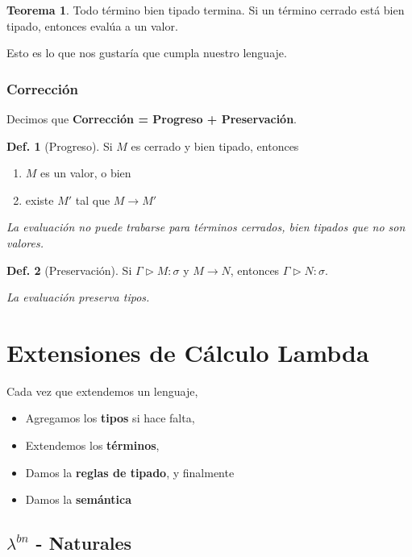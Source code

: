 \documentclass{report}
\theoremstyle{definition} %
\newtheorem{theorem}{Teorema}[chapter]
\newtheorem{definition}{Def.}[chapter]
\newcommand{\tipa}[3]{#1 \rhd #2 : #3} %
\newcommand{\Gtipa}[2]{\tipa{\Gamma}{#1}{#2}}
\newcommand{\lambdabn}{\lambda^{bn}}
\newcommand{\reduces}{\to}
\newcommand{\reduce}[2]{#1 \reduces #2}
\begin{document}
\begin{theorem}
    Todo término bien tipado termina. Si un término cerrado está bien tipado,
    entonces evalúa a un valor.
\end{theorem}

Esto es lo que nos gustaría que cumpla nuestro lenguaje.

\subsubsection{Corrección}\label{sec:correccion}

Decimos que \textbf{Corrección = Progreso + Preservación}.

\begin{definition}[Progreso]
    Si $M$ es cerrado y bien tipado, entonces
    \begin{enumerate}
        \item $M$ es un valor, o bien
        \item existe $M'$ tal que $\reduce{M}{M'}$
    \end{enumerate}

    \textit{La evaluación no puede trabarse para términos cerrados, bien tipados que no son valores.}
\end{definition}

\begin{definition}[Preservación]
    Si $\Gtipa{M}{\sigma}$ y $\reduce{M}{N}$, entonces $\Gtipa{N}{\sigma}$.

    \textit{La evaluación preserva tipos.}
\end{definition}

\section{Extensiones de Cálculo Lambda}

Cada vez que extendemos un lenguaje,

\begin{itemize}
    \item Agregamos los \textbf{tipos} si hace falta,
    \item Extendemos los \textbf{términos},
    \item Damos la \textbf{reglas de tipado}, y finalmente
    \item Damos la \textbf{semántica}
\end{itemize}

\subsection{$\lambdabn$ - Naturales}
\end{document}
